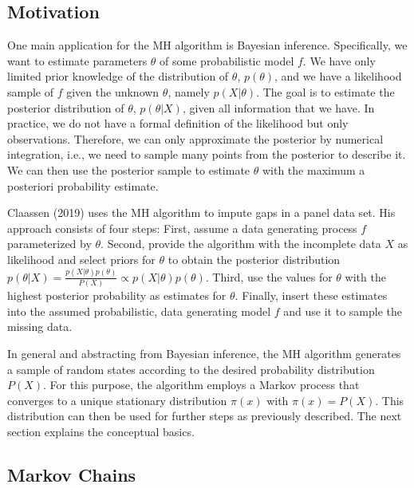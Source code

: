 \documentclass[12pt,english,a4paper,oneside]{article}
\theoremstyle{definition}
\theoremstyle{definition}
\theoremstyle{definition}
\theoremstyle{definition}
\theoremstyle{remark}
\begin{document}
\hypertarget{motivation}{%
\subsection{Motivation}\label{motivation}}

One main application for the MH algorithm is Bayesian inference. Specifically, we want to estimate parameters \(\theta\) of some probabilistic model \(f\). We have only limited prior knowledge of the distribution of \(\theta\), \(p(\theta)\), and we have a likelihood sample of \(f\) given the unknown \(\theta\), namely \(p(X|\theta)\). The goal is to estimate the posterior distribution of \(\theta\), \(p(\theta|X)\), given all information that we have. In practice, we do not have a formal definition of the likelihood but only observations. Therefore, we can only approximate the posterior by numerical integration, i.e., we need to sample many points from the posterior to describe it. We can then use the posterior sample to estimate \(\theta\) with the maximum a posteriori probability estimate.\newline

\noindent
Claassen (2019) uses the MH algorithm to impute gaps in a panel data set. His approach consists of four steps: First, assume a data generating process \(f\) parameterized by \(\theta\). Second, provide the algorithm with the incomplete data \(X\) as likelihood and select priors for \(\theta\) to obtain the posterior distribution \(p(\theta|X) = \frac{p(X|\theta)p(\theta)}{P(X)} \propto p(X|\theta)p(\theta)\). Third, use the values for \(\theta\) with the highest posterior probability as estimates for \(\theta\). Finally, insert these estimates into the assumed probabilistic, data generating model \(f\) and use it to sample the missing data.\newline

\noindent
In general and abstracting from Bayesian inference, the MH algorithm generates a sample of random states according to the desired probability distribution \(P(X)\). For this purpose, the algorithm employs a Markov process that converges to a unique stationary distribution \(\pi(x)\) with \(\pi(x)=P(X)\). This distribution can then be used for further steps as previously described. The next section explains the conceptual basics.

\hypertarget{markov-chains}{%
\subsection{Markov Chains}\label{markov-chains}}
\end{document}
